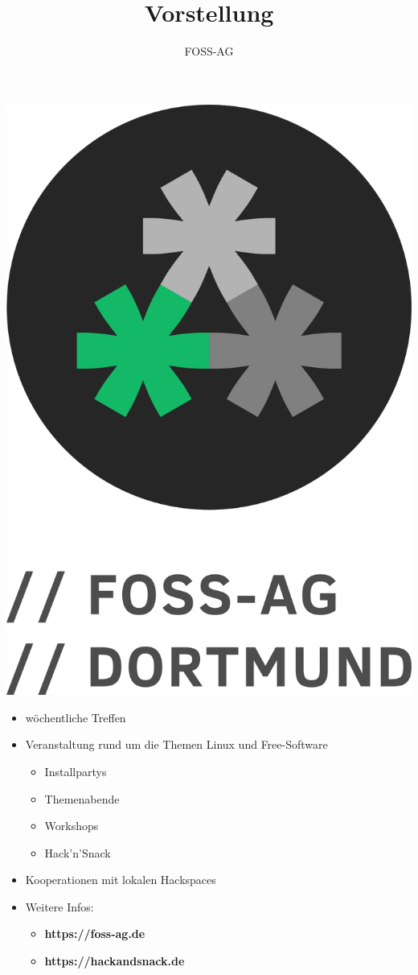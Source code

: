 \documentclass{beamer}
\author{FOSS-AG}
\title{Vorstellung}
\begin{document}
	
	\begin{frame}
		\includegraphics[scale=0.2]{../resources/text-vertikal-transp.png}
		\hspace{0.5cm}
		\begin{minipage}{0.65\linewidth}
			\begin{itemize}
				\item wöchentliche Treffen
				\item Veranstaltung rund um die Themen Linux und Free-Software
				\begin{itemize}
					\item Installpartys
					\item Themenabende
					\item Workshops
					\item Hack'n'Snack
				\end{itemize}
				\item Kooperationen mit lokalen Hackspaces
				\item Weitere Infos:
				\begin{itemize}
					\item[] \textbf{https://foss-ag.de}
					\item[] \textbf{https://hackandsnack.de}
				\end{itemize}
			\end{itemize}
		\end{minipage}
	\end{frame}
\end{document}
